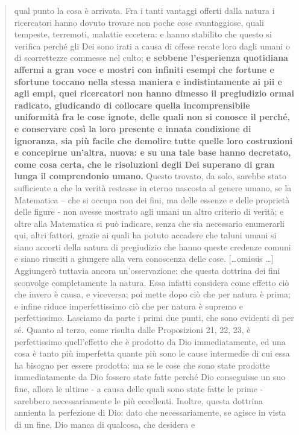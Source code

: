 \begin{quotation}
	qual punto la cosa è arrivata. Fra i tanti vantaggi offerti dalla natura i ricercatori hanno dovuto trovare non poche cose svantaggiose, quali tempeste, terremoti, malattie eccetera: e
	hanno stabilito che questo si verifica perché gli Dei sono irati a causa di offese recate loro
	dagli umani o di scorrettezze commesse nel culto; \textbf{e sebbene l’esperienza quotidiana affermi a gran voce e mostri con infiniti esempi che fortune e sfortune toccano nella stessa maniera e indistintamente ai pii e agli empi, quei ricercatori non hanno dimesso il pregiudizio
	ormai radicato, giudicando di collocare quella incomprensibile uniformità fra le cose
	ignote, delle quali non si conosce il perché, e conservare così la loro presente e innata condizione di ignoranza, sia più facile che demolire tutte quelle loro costruzioni e concepirne
	un’altra, nuova: e su una tale base hanno decretato, come cosa certa, che le risoluzioni degli Dei superano di gran lunga il comprendonio umano.} Questo trovato, da solo, sarebbe
	stato sufficiente a che la verità restasse in eterno nascosta al genere umano, se la Matematica – che si occupa non dei fini, ma delle essenze e delle proprietà delle figure - non avesse
	mostrato agli umani un altro criterio di verità; e oltre alla Matematica si può indicare, senza che sia necessario enumerarli qui, altri fattori, grazie ai quali ha potuto accadere che taluni umani si siano accorti della natura di pregiudizio che hanno queste credenze comuni e
	siano riusciti a giungere alla vera conoscenza delle cose.
	[\dots omissis \dots]\\
	Aggiungerò tuttavia ancora un’osservazione: che questa dottrina dei fini sconvolge
	completamente la natura. Essa infatti considera come effetto ciò che invero è causa, e viceversa; poi mette dopo ciò che per natura è prima; e infine riduce imperfettissimo ciò che
	per natura è supremo e perfettissimo. Lasciamo da parte i primi due punti, che sono evidenti di per sé. Quanto al terzo, come risulta dalle Proposizioni 21, 22, 23, è perfettissimo
	quell’effetto che è prodotto da Dio immediatamente, ed una cosa è tanto più imperfetta
	quante più sono le cause intermedie di cui essa ha bisogno per essere prodotta: ma se le cose che sono state prodotte immediatamente da Dio fossero state fatte perché Dio conseguisse un suo fine, allora le ultime - a causa delle quali sono state fatte le prime - sarebbero
	necessariamente le più eccellenti. Inoltre, questa dottrina annienta la perfezione di Dio: dato che necessariamente, se agisce in vista di un fine, Dio manca di qualcosa, che desidera e

\end{quotation}
